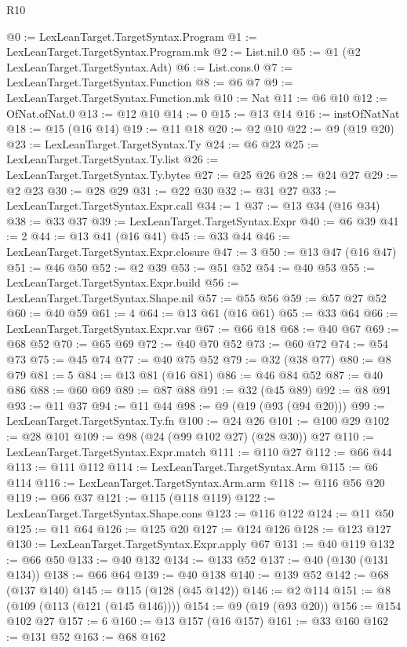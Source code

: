 \begin{lexlean}{R10}
\begin{coremodule}
@0 := LexLeanTarget.TargetSyntax.Program
@1 := LexLeanTarget.TargetSyntax.Program.mk
@2 := List.nil.{0}
@5 := @1 (@2 LexLeanTarget.TargetSyntax.Adt)
@6 := List.cons.{0}
@7 := LexLeanTarget.TargetSyntax.Function
@8 := @6 @7
@9 := LexLeanTarget.TargetSyntax.Function.mk
@10 := Nat
@11 := @6 @10
@12 := OfNat.ofNat.{0}
@13 := @12 @10
@14 := 0
@15 := @13 @14
@16 := instOfNatNat
@18 := @15 (@16 @14)
@19 := @11 @18
@20 := @2 @10
@22 := @9 (@19 @20)
@23 := LexLeanTarget.TargetSyntax.Ty
@24 := @6 @23
@25 := LexLeanTarget.TargetSyntax.Ty.list
@26 := LexLeanTarget.TargetSyntax.Ty.bytes
@27 := @25 @26
@28 := @24 @27
@29 := @2 @23
@30 := @28 @29
@31 := @22 @30
@32 := @31 @27
@33 := LexLeanTarget.TargetSyntax.Expr.call
@34 := 1
@37 := @13 @34 (@16 @34)
@38 := @33 @37
@39 := LexLeanTarget.TargetSyntax.Expr
@40 := @6 @39
@41 := 2
@44 := @13 @41 (@16 @41)
@45 := @33 @44
@46 := LexLeanTarget.TargetSyntax.Expr.closure
@47 := 3
@50 := @13 @47 (@16 @47)
@51 := @46 @50
@52 := @2 @39
@53 := @51 @52
@54 := @40 @53
@55 := LexLeanTarget.TargetSyntax.Expr.build
@56 := LexLeanTarget.TargetSyntax.Shape.nil
@57 := @55 @56
@59 := @57 @27 @52
@60 := @40 @59
@61 := 4
@64 := @13 @61 (@16 @61)
@65 := @33 @64
@66 := LexLeanTarget.TargetSyntax.Expr.var
@67 := @66 @18
@68 := @40 @67
@69 := @68 @52
@70 := @65 @69
@72 := @40 @70 @52
@73 := @60 @72
@74 := @54 @73
@75 := @45 @74
@77 := @40 @75 @52
@79 := @32 (@38 @77)
@80 := @8 @79
@81 := 5
@84 := @13 @81 (@16 @81)
@86 := @46 @84 @52
@87 := @40 @86
@88 := @60 @69
@89 := @87 @88
@91 := @32 (@45 @89)
@92 := @8 @91
@93 := @11 @37
@94 := @11 @44
@98 := @9 (@19 (@93 (@94 @20)))
@99 := LexLeanTarget.TargetSyntax.Ty.fn
@100 := @24 @26
@101 := @100 @29
@102 := @28 @101
@109 := @98 (@24 (@99 @102 @27) (@28 @30)) @27
@110 := LexLeanTarget.TargetSyntax.Expr.match
@111 := @110 @27
@112 := @66 @44
@113 := @111 @112
@114 := LexLeanTarget.TargetSyntax.Arm
@115 := @6 @114
@116 := LexLeanTarget.TargetSyntax.Arm.arm
@118 := @116 @56 @20
@119 := @66 @37
@121 := @115 (@118 @119)
@122 := LexLeanTarget.TargetSyntax.Shape.cons
@123 := @116 @122
@124 := @11 @50
@125 := @11 @64
@126 := @125 @20
@127 := @124 @126
@128 := @123 @127
@130 := LexLeanTarget.TargetSyntax.Expr.apply @67
@131 := @40 @119
@132 := @66 @50
@133 := @40 @132
@134 := @133 @52
@137 := @40 (@130 (@131 @134))
@138 := @66 @64
@139 := @40 @138
@140 := @139 @52
@142 := @68 (@137 @140)
@145 := @115 (@128 (@45 @142))
@146 := @2 @114
@151 := @8 (@109 (@113 (@121 (@145 @146))))
@154 := @9 (@19 (@93 @20))
@156 := @154 @102 @27
@157 := 6
@160 := @13 @157 (@16 @157)
@161 := @33 @160
@162 := @131 @52
@163 := @68 @162

\end{coremodule}
\end{lexlean}
